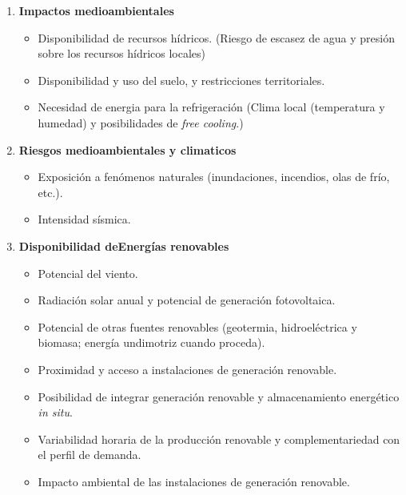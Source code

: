 \begin{enumerate}[label=\arabic*. ,leftmargin=*,itemsep=1em]
    \item \textbf{Impactos medioambientales}
    \begin{itemize}[leftmargin=*,nosep]
        
        \item Disponibilidad de recursos hídricos. (Riesgo de escasez de agua y presión sobre los recursos hídricos locales)
        \item Disponibilidad y uso del suelo, y restricciones territoriales. %
        \item Necesidad de energia para la refrigeración (Clima local (temperatura y humedad) y posibilidades de \textit{free cooling}.)
    \end{itemize}

     \item \textbf{Riesgos medioambientales y climaticos}
    \begin{itemize}[leftmargin=*,nosep]
        \item Exposición a fenómenos naturales (inundaciones, incendios, olas de frío, etc.).
        \item Intensidad sísmica.
    \end{itemize}

    \item \textbf{Disponibilidad deEnergías renovables}
    \begin{itemize}[leftmargin=*,nosep]
        \item Potencial del viento.
        \item Radiación solar anual y potencial de generación fotovoltaica. %
        \item Potencial de otras fuentes renovables (geotermia, hidroeléctrica y biomasa; energía undimotriz cuando proceda). %
        \item Proximidad y acceso a instalaciones de generación renovable. %
        \item Posibilidad de integrar generación renovable y almacenamiento energético \textit{in situ}. %
        \item Variabilidad horaria de la producción renovable y complementariedad con el perfil de demanda. %
        \item Impacto ambiental de las instalaciones de generación renovable. %
    \end{itemize}


\end{enumerate}
